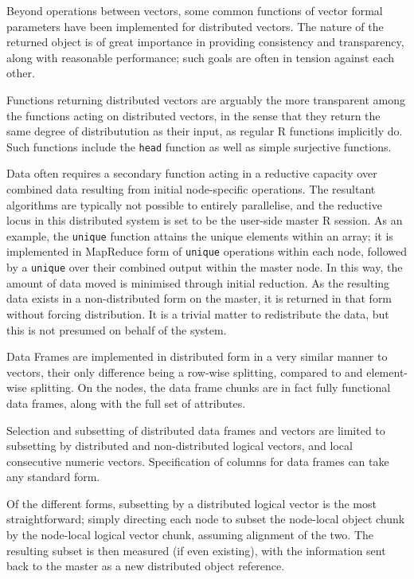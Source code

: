 \documentclass[a4paper,10pt]{article}
\begin{document}
Beyond operations between vectors, some common functions of vector formal
parameters have been implemented for distributed vectors.  The nature of the
returned object is of great importance in providing consistency and
transparency, along with reasonable performance; such goals are often in
tension against each other.

Functions returning distributed vectors are arguably the more transparent among
the functions acting on distributed vectors, in the sense that they return the
same degree of distributution as their input, as regular R functions implicitly
do.  Such functions include the \texttt{head} function as well as simple
surjective functions.

Data often requires a secondary function acting in a reductive capacity over
combined data resulting from initial node-specific operations.  The resultant
algorithms are typically not possible to entirely parallelise, and the
reductive locus in this distributed system is set to be the user-side master R
session.  As an example, the \texttt{unique} function attains the unique
elements within an array; it is implemented in MapReduce form of
\texttt{unique} operations within each node, followed by a \texttt{unique} over
their combined output within the master node.  In this way, the amount of data
moved is minimised through initial reduction.  As the resulting data exists in
a non-distributed form on the master, it is returned in that form without
forcing distribution.  It is a trivial matter to redistribute the data, but
this is not presumed on behalf of the system.

Data Frames are implemented in distributed form in a very similar manner to
vectors, their only difference being a row-wise splitting, compared to and
element-wise splitting.  On the nodes, the data frame chunks are in fact fully
functional data frames, along with the full set of attributes.

Selection and subsetting of distributed data frames and vectors are limited to
subsetting by distributed and non-distributed logical vectors, and local
consecutive numeric vectors.  Specification of columns for data frames can take
any standard form.

Of the different forms, subsetting by a distributed logical vector is the most
straightforward; simply directing each node to subset the node-local object
chunk by the node-local logical vector chunk, assuming alignment of the two.
The resulting subset is then measured (if even existing), with the information
sent back to the master as a new distributed object reference.
\end{document}
